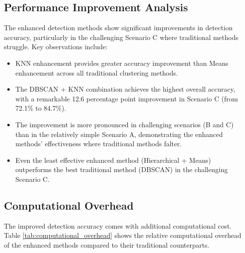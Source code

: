 \subsection{Performance Improvement Analysis}

The enhanced detection methods show significant improvements in detection accuracy, particularly in the challenging Scenario C where traditional methods struggle. Key observations include:

\begin{itemize}
    \item KNN enhancement provides greater accuracy improvement than Means enhancement across all traditional clustering methods.
    
    \item The DBSCAN + KNN combination achieves the highest overall accuracy, with a remarkable 12.6 percentage point improvement in Scenario C (from 72.1\% to 84.7\%).
    
    \item The improvement is more pronounced in challenging scenarios (B and C) than in the relatively simple Scenario A, demonstrating the enhanced methods' effectiveness where traditional methods falter.
    
    \item Even the least effective enhanced method (Hierarchical + Means) outperforms the best traditional method (DBSCAN) in the challenging Scenario C.
\end{itemize}

\subsection{Computational Overhead}

The improved detection accuracy comes with additional computational cost. Table \ref{tab:computational_overhead} shows the relative computational overhead of the enhanced methods compared to their traditional counterparts.

